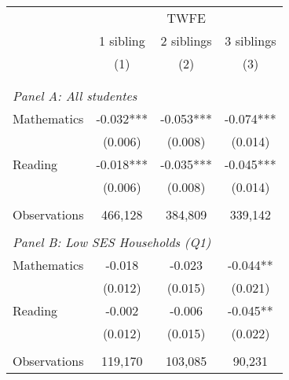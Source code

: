 \makeatletter
{}
{
\makeatother
\begin{tabular}{lccc}
\toprule
\cmidrule(lr){2-4}
& \multicolumn{3}{c}{TWFE} \\
\cmidrule(lr){2-4}
& 1 sibling & 2 siblings & 3 siblings  \\
\cmidrule(lr){2-2} \cmidrule(lr){3-3} \cmidrule(lr){4-4}
& (1) & (2) & (3)\\
\bottomrule
&  &  &  \\
&  &  &   \\
\multicolumn{4}{l}{\textit{Panel A: All studentes}} \\
\hspace{3mm}Mathematics&      -0.032***&      -0.053***&      -0.074***\\
                    &     (0.006)   &     (0.008)   &     (0.014)   \\
 
\hspace{3mm}Reading &      -0.018***&      -0.035***&      -0.045***\\
                    &     (0.006)   &     (0.008)   &     (0.014)   \\
                    &               &               &               \\
\hspace{3mm}Observations&     466,128   &     384,809   &     339,142   \\
 
&  &  &   \\
\multicolumn{4}{l}{\textit{Panel B: Low SES Households (Q1)}} \\
\hspace{3mm}Mathematics&      -0.018   &      -0.023   &      -0.044** \\
                    &     (0.012)   &     (0.015)   &     (0.021)   \\
 
\hspace{3mm}Reading &      -0.002   &      -0.006   &      -0.045** \\
                    &     (0.012)   &     (0.015)   &     (0.022)   \\
                    &               &               &               \\
\hspace{3mm}Observations&     119,170   &     103,085   &      90,231   \\
 

\end{tabular}}
